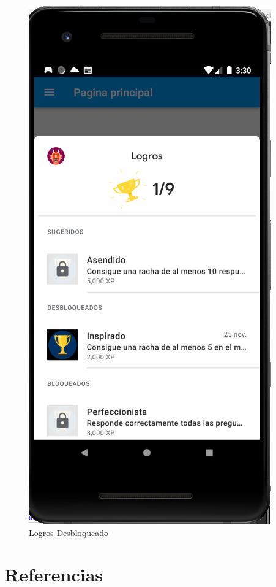 \documentclass{article}
\begin{document}
\begin{figure}[H]
    \centering
    \includegraphics[scale=0.8]{imgs/Test/LogroDes2}
    \caption{Logros Desbloqueado}
\end{figure}


\pagebreak\section{Referencias}

\printbibliography[heading=none]
\end{document}
